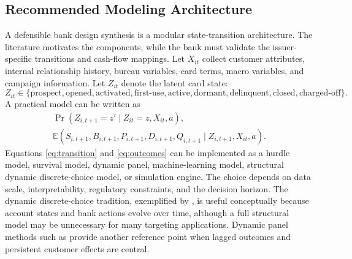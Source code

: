 \documentclass[11pt]{article}
\newcommand{\E}{\mathbb{E}}
\newcommand{\1}{\mathbf{1}}
\begin{document}
\subsection{Recommended Modeling Architecture}
\label{sec:architecture}

A defensible bank design synthesis is a modular state-transition architecture.
The literature motivates the components, while the bank must validate the
issuer-specific transitions and cash-flow mappings. Let $X_{it}$
collect customer attributes, internal relationship history, bureau variables,
card terms, macro variables, and campaign information. Let $Z_{it}$ denote the
latent card state:
\[
  Z_{it} \in
  \{\text{prospect},\text{opened},\text{activated},\text{first-use},
    \text{active},\text{dormant},\text{delinquent},\text{closed},
    \text{charged-off}\}.
\]
A practical model can be written as
\begin{align}
  \Pr(Z_{i,t+1}=z' \mid Z_{it}=z, X_{it}, a), \label{eq:transition}\\
  \E(S_{i,t+1},B_{i,t+1},P_{i,t+1},D_{i,t+1},Q_{i,t+1}
      \mid Z_{i,t+1},X_{it},a). \label{eq:outcomes}
\end{align}
Equations \eqref{eq:transition} and \eqref{eq:outcomes} can be implemented as a
hurdle model, survival model, dynamic panel, machine-learning model, structural
dynamic discrete-choice model, or simulation engine. The choice depends on data
scale, interpretability, regulatory constraints, and the decision horizon. The
dynamic discrete-choice tradition, exemplified by \citet{rust1987replacement},
is useful conceptually because account states and bank actions evolve over time,
although a full structural model may be unnecessary for many targeting
applications. Dynamic panel methods such as \citet{blundell1998initial} provide
another reference point when lagged outcomes and persistent customer effects are
central.
\end{document}
